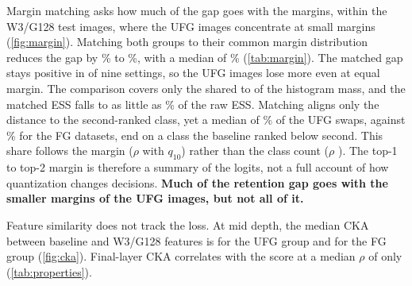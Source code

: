 Margin matching asks how much of the gap goes with the margins, within the W3/G128 test images, where the UFG images concentrate at small margins (\cref{fig:margin}).
Matching both groups to their common margin distribution reduces the gap by \% to \%, with a median of \% (\cref{tab:margin}).
The matched gap stays positive in  of nine settings, so the UFG images lose more even at equal margin.
The comparison covers only the shared  to  of the histogram mass, and the matched ESS falls to as little as \% of the raw ESS.
Matching aligns only the distance to the second-ranked class, yet a median of \% of the UFG swaps, against \% for the FG datasets, end on a class the baseline ranked below second.
This share follows the margin ($\rho$  with $q_{10}$) rather than the class count ($\rho$ ).
The top-1 to top-2 margin is therefore a summary of the logits, not a full account of how quantization changes decisions.
\textbf{Much of the retention gap goes with the smaller margins of the UFG images, but not all of it.}

Feature similarity does not track the loss.
At mid depth, the median CKA between baseline and W3/G128 features is  for the UFG group and  for the FG group (\cref{fig:cka}).
Final-layer CKA correlates with the score at a median $\rho$ of only  (\cref{tab:properties}).
